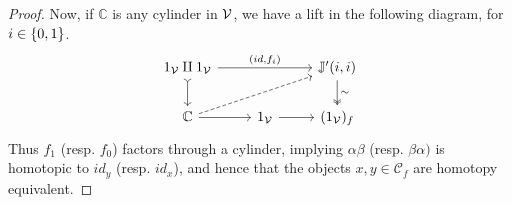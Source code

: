 \documentclass[a4paper,10pt
,draft
]{article}%
\newcommand{\J}{\mathbb J}
\renewcommand{\1}{\eta}%
\begin{document}
\begin{proof}
      Now, if $\mathbb C$ is any cylinder in $\mathcal V$, we have a lift in the following diagram, for $i \in \left\{0,1\right\}$.
      \begin{equation}
            \label{J11_CYL_EQ}
            \begin{tikzcd}
                  1_\V \amalg 1_\V \arrow[rr, "{(id, f_i)}"] \arrow[d, tail]
                  &&
                  \J'(i,i) \arrow[d, "\sim", two heads]
                  \\
                  \mathbb C \arrow[r] \arrow[urr, dashed]
                  &
                  1_\V \arrow[r]
                  &
                  (1_\V)_f
              \end{tikzcd}
        \end{equation}
        Thus $f_1$ (resp. $f_0$) factors through a cylinder,
        implying $\alpha\beta$ (resp. $\beta\alpha)$ is homotopic to $id_y$ (resp. $id_x$),
        and hence that the objects $x,y\in \mathcal C_f$ are homotopy equivalent.
  \end{proof}
  
\end{document}

